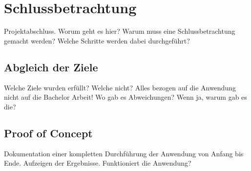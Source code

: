 
\chapter{Schlussbetrachtung}\label{cha:Schlussbetrachtung}
Projektabschluss. Worum geht es hier? Warum muss eine Schlussbetrachtung gemacht werden? Welche Schritte werden dabei durchgeführt?

\section{Abgleich der Ziele}
Welche Ziele wurden erfüllt? Welche nicht? Alles bezogen auf die Anwendung nicht auf die Bachelor Arbeit! Wo gab es Abweichungen? Wenn ja, warum gab es die?

\section{Proof of Concept}
Dokumentation einer kompletten Durchführung der Anwendung von Anfang bis Ende. Aufzeigen der Ergebnisse. Funktioniert die Anwendung?
